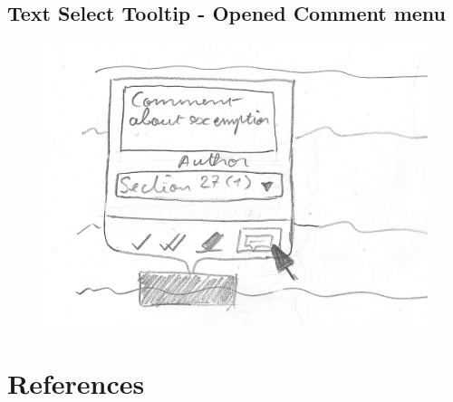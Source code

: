 \documentclass{l4proj}
\begin{document}
\begin{appendices}
    \section{Text Select Tooltip - Opened Comment menu}
    \begin{figure}[H]
        \centering
        \includegraphics[width=\linewidth]{images/wireframes/tooltip_comment.jpg}
    \end{figure}
\end{appendices}


\newpage


\section*{References}

\printbibliography[heading=none]

\vspace*{\fill}
\doclicenseThis
\end{document}
